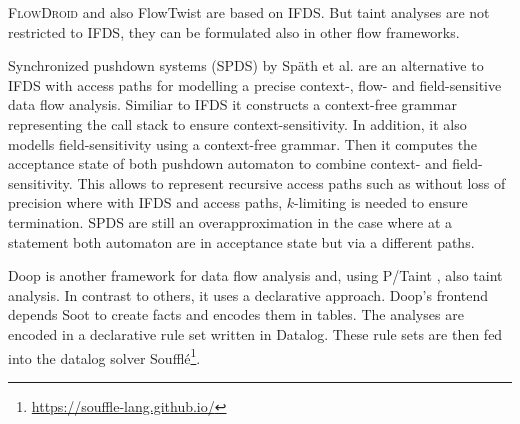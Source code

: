 \documentclass[../draft.tex]{subfiles}
\begin{document}
    \textsc{FlowDroid} and also FlowTwist are based on IFDS. But taint analyses are not restricted to IFDS, they can be formulated also in other flow frameworks. 

    Synchronized pushdown systems (SPDS) by Späth et al.\cite{Spaeth2019} are an alternative to IFDS with access paths for modelling a precise context-, flow- and field-sensitive data flow analysis. Similiar to IFDS it constructs a context-free grammar representing the call stack to ensure context-sensitivity. In addition, it also modells field-sensitivity using a context-free grammar. Then it computes the acceptance state of both pushdown automaton to combine context- and field-sensitivity. This allows to represent recursive access paths such as  without loss of precision where with IFDS and access paths, $k$-limiting is needed to ensure termination. SPDS are still an overapproximation in the case where at a statement both automaton are in acceptance state but via a different paths.

    Doop \cite{Bravenboer2009} is another framework for data flow analysis and, using P/Taint \cite{Grech2017}, also taint analysis. In contrast to others, it uses a declarative approach. Doop's frontend depends Soot to create facts and encodes them in tables. The analyses are encoded in a declarative rule set written in Datalog. These rule sets are then fed into the datalog solver Soufflé\footnote{\url{https://souffle-lang.github.io/}}.
\end{document}
